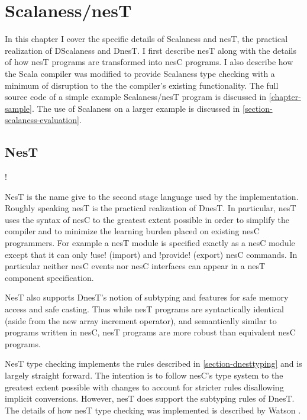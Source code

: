 \chapter{Scalaness/nesT}
\label{chapter-scalaness-nest}

In this chapter I cover the specific details of Scalaness and nesT, the practical realization of
DScalaness and DnesT. I first describe nesT along with the details of how nesT programs are
transformed into nesC programs. I also describe how the Scala compiler was modified to provide
Scalaness type checking with a minimum of disruption to the the compiler's existing
functionality. The full source code of a simple example Scalaness/nesT program is discussed in
\autoref{chapter-sample}. The use of Scalaness on a larger example is discussed in
\autoref{section-scalaness-evaluation}.

\section{NesT}
\label{section-nest-implementation}

\lstset{language=nesC}
\lstMakeShortInline!

NesT is the name give to the second stage language used by the implementation. Roughly speaking
nesT is the practical realization of DnesT. In particular, nesT uses the syntax of nesC to the
greatest extent possible in order to simplify the compiler and to minimize the learning burden
placed on existing nesC programmers. For example a nesT module is specified exactly as a nesC
module except that it can only !use! (import) and !provide! (export) nesC commands. In
particular neither nesC events nor nesC interfaces can appear in a nesT component specification.

NesT also supports DnesT's notion of subtyping and features for safe memory access and safe
casting. Thus while nesT programs are syntactically identical (aside from the new array
increment operator), and semantically similar to programs written in nesC, nesT programs are
more robust than equivalent nesC programs.

NesT type checking implements the rules described in \autoref{section-dnesttyping} and is
largely straight forward. The intention is to follow nesC's type system to the greatest extent
possible with changes to account for stricter rules disallowing implicit conversions. However,
nesT does support the subtyping rules of DnesT. The details of how nesT type checking was
implemented is described by Watson \cite{watson-masters-2013}.

